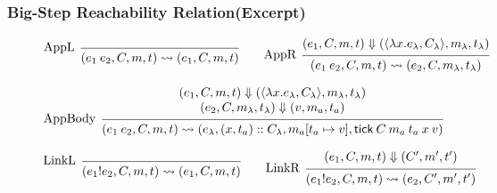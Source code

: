 \documentclass{beamer}
\newcommand*{\cons}{::}
\newcommand*{\mem}{m}
\newcommand*{\link}[2]{{#1}\mathtt{!}{#2}}
\newcommand*{\tick}{\mathsf{tick}}
\begin{document}
\begin{frame}[c]
  \frametitle{Big-Step Reachability Relation(Excerpt)}
  \begin{figure}[htb]
    \begin{flushright}\fbox{$(e,C,\mem,t)\rightsquigarrow(e',C',\mem',t')$}\end{flushright}
    \centering
    \footnotesize
    \[
      \begin{prooftree}
        \infer[left label={AppL}]0{
        (e_{1}\:e_{2}, C, \mem, t)
        \rightsquigarrow
        (e_{1},C, \mem,t)
        }
      \end{prooftree}\qquad
      \begin{prooftree}
        \hypo{
          \begin{matrix}
            (e_{1}, C, \mem, t)
            \Downarrow
            (\langle\lambda x.e_{\lambda}, C_{\lambda}\rangle, \mem_{\lambda}, t_{\lambda})
          \end{matrix}
        }
        \infer[left label={AppR}]1{
        (e_{1}\:e_{2}, C, \mem, t)
        \rightsquigarrow
        (e_{2}, C, \mem_{\lambda}, t_{\lambda})
        }
      \end{prooftree}
    \]

    \[
      \begin{prooftree}
        \hypo{
          \begin{matrix}
            (e_{1}, C, \mem, t)
            \Downarrow
            (\langle\lambda x.e_{\lambda}, C_{\lambda}\rangle, \mem_{\lambda}, t_{\lambda}) \\
            (e_{2}, C, \mem_{\lambda}, t_{\lambda})
            \Downarrow
            (v, \mem_{a}, t_{a})
          \end{matrix}
        }
        \infer[left label={AppBody}]1{
        (e_{1}\:e_{2}, C, \mem, t)
        \rightsquigarrow
        (e_{\lambda}, (x, t_{a})\cons C_{\lambda}, \mem_{a}[t_{a}\mapsto v], \tick\:C\:\mem_{a}\:t_{a}\:x\:v)
        }
      \end{prooftree}
    \]

    \[
      \begin{prooftree}
        \infer[left label=LinkL]0{
        (\link{e_{1}}{e_{2}}, C, \mem, t)
        \rightsquigarrow
        (e_{1}, C, \mem, t)
        }
      \end{prooftree}\qquad
      \begin{prooftree}
        \hypo{
          \begin{matrix}
            (e_{1}, C, \mem, t)
            \Downarrow
            (C', \mem', t')
          \end{matrix}
        }
        \infer[left label=LinkR]1{
        (\link{e_{1}}{e_{2}}, C, \mem, t)
        \rightsquigarrow
        (e_{2}, C', \mem', t')
        }
      \end{prooftree}
    \]
  \end{figure}
\end{frame}
\end{document}
